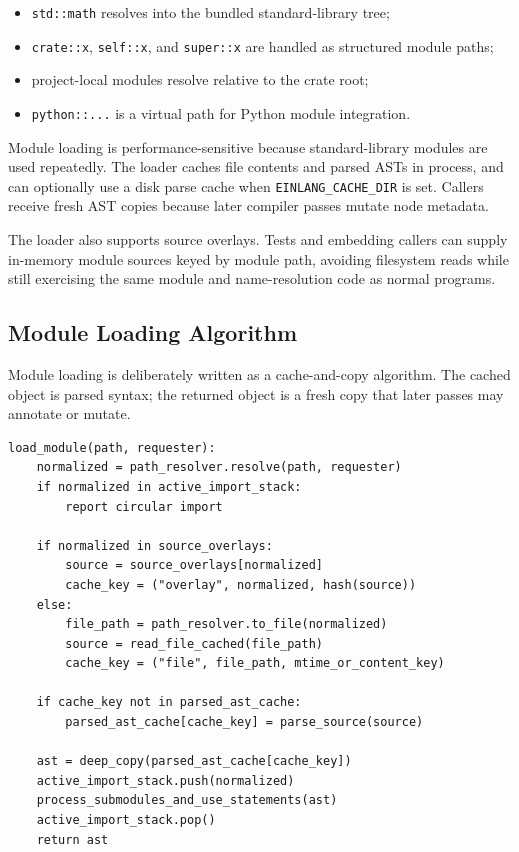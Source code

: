\begin{itemize}
\item \texttt{std::math} resolves into the bundled standard-library tree;
\item \texttt{crate::x}, \texttt{self::x}, and \texttt{super::x} are handled as
structured module paths;
\item project-local modules resolve relative to the crate root;
\item \texttt{python::...} is a virtual path for Python module integration.
\end{itemize}

Module loading is performance-sensitive because standard-library modules are
used repeatedly. The loader caches file contents and parsed ASTs in process, and
can optionally use a disk parse cache when \texttt{EINLANG\_CACHE\_DIR} is set.
Callers receive fresh AST copies because later compiler passes mutate node
metadata.

The loader also supports source overlays. Tests and embedding callers can supply
in-memory module sources keyed by module path, avoiding filesystem reads while
still exercising the same module and name-resolution code as normal programs.

\subsection{Module Loading Algorithm}

Module loading is deliberately written as a cache-and-copy algorithm. The
cached object is parsed syntax; the returned object is a fresh copy that later
passes may annotate or mutate.

\begin{lstlisting}[style=pythoncode,caption={Source overlay and module-cache resolution.}]
load_module(path, requester):
    normalized = path_resolver.resolve(path, requester)
    if normalized in active_import_stack:
        report circular import

    if normalized in source_overlays:
        source = source_overlays[normalized]
        cache_key = ("overlay", normalized, hash(source))
    else:
        file_path = path_resolver.to_file(normalized)
        source = read_file_cached(file_path)
        cache_key = ("file", file_path, mtime_or_content_key)

    if cache_key not in parsed_ast_cache:
        parsed_ast_cache[cache_key] = parse_source(source)

    ast = deep_copy(parsed_ast_cache[cache_key])
    active_import_stack.push(normalized)
    process_submodules_and_use_statements(ast)
    active_import_stack.pop()
    return ast
\end{lstlisting}


